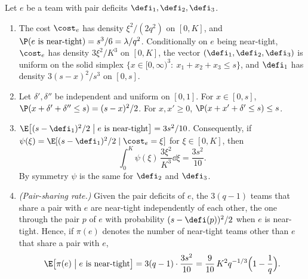 \begin{lemma}\label{lem:localconv-oneteam}
Let $e$ be a team with pair deficits $\defi_1,\defi_2,\defi_3$.
\begin{enumerate}
\item[\textup{(i)}] The cost $\cost_e$ has density $\xi^2/(2q^2)$ on $[0,K]$, and
$\P(e\text{ is near-tight})=s^3/6=\lambda/q^2$. Conditionally on $e$ being near-tight,
$\cost_e$ has density $3\xi^2/K^3$ on $[0,K]$, the vector $(\defi_1,\defi_2,\defi_3)$ is
uniform on the solid simplex $\{x\in[0,\infty)^3:\ x_1+x_2+x_3\le s\}$, and $\defi_1$ has
density $3(s-x)^2/s^3$ on $[0,s]$.
\item[\textup{(ii)}] Let $\delta',\delta''$ be independent and uniform on $[0,1]$. For
$x\in[0,s]$, $\P(x+\delta'+\delta''\le s)=(s-x)^2/2$. For $x,x'\ge0$,
$\P(x+x'+\delta'\le s)\le s$.
\item[\textup{(iii)}] $\E\bigl[(s-\defi_1)^2/2\bigm|e\text{ is near-tight}\bigr]=3s^2/10$.
Consequently, if $\psi(\xi)=\E[(s-\defi_1)^2/2\mid\cost_e=\xi]$ for $\xi\in[0,K]$, then
\begin{equation}\label{eq:localconv-psi}
\int_0^K\psi(\xi)\,\frac{3\xi^2}{K^3}\dd\xi=\frac{3s^2}{10}.
\end{equation}
By symmetry $\psi$ is the same for $\defi_2$ and $\defi_3$.
\item[\textup{(iv)}] \emph{(Pair-sharing rate.)} Given the pair deficits of $e$, the
$3(q-1)$ teams that share a pair with $e$ are near-tight independently of each other, the
one through the pair $p$ of $e$ with probability $(s-\defi(p))^2/2$ when $e$ is near-tight.
Hence,
if $\pi(e)$ denotes the number of near-tight teams other than $e$ that share a pair with
$e$,
\begin{equation}\label{eq:localconv-pairsharing}
\E\bigl[\pi(e)\bigm|e\text{ is near-tight}\bigr]
=3(q-1)\cdot\frac{3s^2}{10}=\frac9{10}\,K^2q^{-1/3}\Bigl(1-\frac1q\Bigr).
\end{equation}
\end{enumerate}
\end{lemma}

